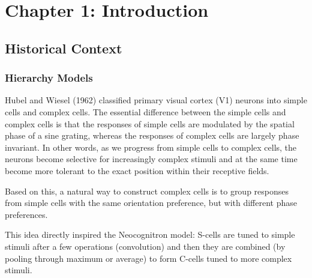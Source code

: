 
\chapter{Chapter 1: Introduction} %

\label{Chapter1} %


\section{Historical Context}
\subsection{Hierarchy Models}
\par Hubel and Wiesel (1962) classified primary visual cortex (V1) neurons into simple cells and complex cells. The essential difference between the simple cells and complex cells is that the responses of simple cells are modulated by the spatial phase of a sine grating, whereas the responses of complex cells are largely phase invariant. In other words, as we progress from simple cells to complex cells, the neurons become selective for increasingly complex stimuli and at the same time become more tolerant to the exact position within their receptive fields. 

\par Based on this, a natural way to construct complex cells is to group responses from simple cells with the same orientation preference, but with different phase preferences.

\par This idea directly inspired the Neocognitron model:  S-cells are tuned to simple stimuli after a few operations (convolution) and then they are combined (by pooling through maximum or average) to form C-cells tuned to more complex stimuli. 


